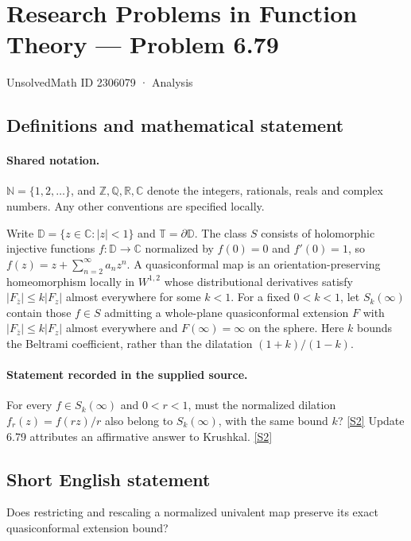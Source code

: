 \documentclass[11pt]{article}
\newcommand{\sref}[2]{\hyperlink{source:#1:#2}{[S#2]}}
\begin{document}
\setcounter{section}{2306078}
\section{Research Problems in Function Theory — Problem 6.79}\label{2306079}
{\small\sffamily UnsolvedMath ID 2306079 · Analysis}
\subsection{Definitions and mathematical statement}

\paragraph{Shared notation.}$\mathbb N=\{1,2,\ldots\}$, and $\mathbb Z,\mathbb Q,\mathbb R,\mathbb C$ denote the integers, rationals, reals and complex numbers. Any other conventions are specified locally.


Write $\mathbb D=\{z\in\mathbb C:|z|<1\}$ and $\mathbb T=\partial\mathbb D$. The class $S$ consists of holomorphic injective functions $f:\mathbb D\to\mathbb C$ normalized by $f(0)=0$ and $f'(0)=1$, so $f(z)=z+\sum_{n=2}^{\infty}a_nz^n$. A quasiconformal map is an orientation-preserving homeomorphism locally in $W^{1,2}$ whose distributional derivatives satisfy $|F_{\bar z}|\le k|F_z|$ almost everywhere for some $k<1$. For a fixed $0<k<1$, let $S_k(\infty)$ contain those $f\in S$ admitting a whole-plane quasiconformal extension $F$ with $|F_{\bar z}|\le k|F_z|$ almost everywhere and $F(\infty)=\infty$ on the sphere. Here $k$ bounds the Beltrami coefficient, rather than the dilatation $(1+k)/(1-k)$.
\paragraph{Statement recorded in the supplied source.}
For every $f\in S_k(\infty)$ and $0<r<1$, must the normalized dilation $f_r(z)=f(rz)/r$ also belong to $S_k(\infty)$, with the same bound $k$? \sref{2306079}{2}
Update 6.79 attributes an affirmative answer to Krushkal. \sref{2306079}{2}
\subsection{Short English statement}
Does restricting and rescaling a normalized univalent map preserve its exact quasiconformal extension bound?
\end{document}
